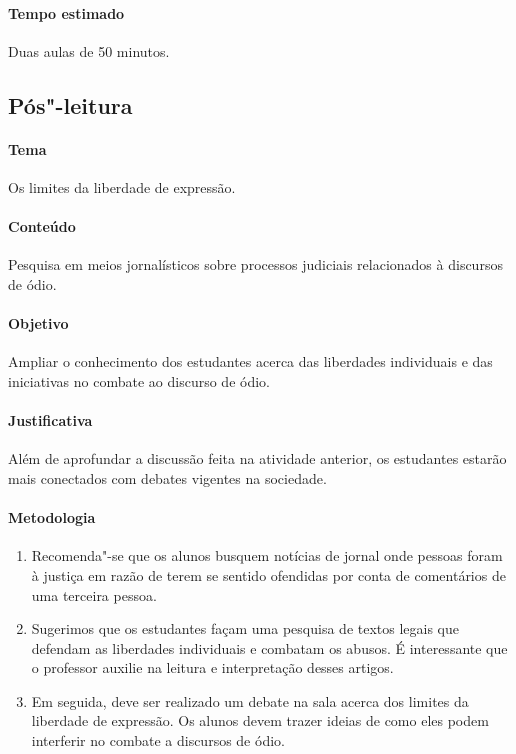 \documentclass[12pt]{extarticle}
\begin{document}
\paragraph{Tempo estimado} Duas aulas de 50 minutos. 

\subsection{Pós"-leitura}


\paragraph{Tema} Os limites da liberdade de expressão.

\paragraph{Conteúdo} Pesquisa em meios jornalísticos sobre processos judiciais
relacionados à discursos de ódio.

\paragraph{Objetivo} Ampliar o conhecimento dos estudantes
acerca das liberdades individuais e das iniciativas no combate ao discurso de ódio.

\paragraph{Justificativa} Além de aprofundar a discussão feita
na atividade anterior, os estudantes estarão mais conectados com debates
vigentes na sociedade.

\paragraph{Metodologia} 

\begin{enumerate}

\item Recomenda"-se que os alunos busquem notícias de jornal onde pessoas foram
à justiça em razão de terem se sentido ofendidas por conta de
comentários de uma terceira pessoa.

\item Sugerimos que os estudantes façam uma pesquisa de 
textos legais que defendam as liberdades individuais e
combatam os abusos. É interessante que o professor auxilie
 na leitura e interpretação desses artigos.
 
\item Em seguida, deve ser realizado um
debate na sala acerca dos limites da liberdade de expressão.
Os alunos devem trazer ideias de como eles
podem interferir no combate a discursos de ódio.

\end{enumerate}
\end{document}
